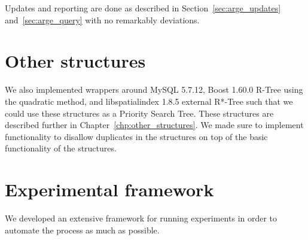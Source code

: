 \documentclass[twoside,11pt,openright]{report}
\begin{document}
Updates and reporting are done as described in Section~\ref{sec:arge_updates} and~\ref{sec:arge_query} with no remarkably deviations.

\section{Other structures}
We also implemented wrappers around MySQL 5.7.12, Boost 1.60.0 R-Tree using the quadratic method, and libspatialindex 1.8.5 external R*-Tree such that we could use these structures as a Priority Search Tree. These structures are described further in Chapter~\ref{chp:other_structures}. We made sure to implement functionality to disallow duplicates in the structures on top of the basic functionality of the structures.

\section{Experimental framework}
We developed an extensive framework for running experiments in order to automate the process as much as possible.
\end{document}
